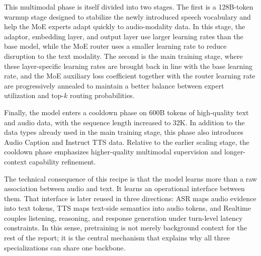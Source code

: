 \documentclass{llmxive}
\begin{document}
This multimodal phase is itself divided into two stages. The first is a 128B-token warmup stage designed to stabilize the newly introduced speech vocabulary and help the MoE experts adapt quickly to audio-modality data. In this stage, the adaptor, embedding layer, and output layer use larger learning rates than the base model, while the MoE router uses a smaller learning rate to reduce disruption to the text modality. The second is the main training stage, where these layer-specific learning rates are brought back in line with the base learning rate, and the MoE auxiliary loss coefficient together with the router learning rate are progressively annealed to maintain a better balance between expert utilization and top-$k$ routing probabilities.

Finally, the model enters a cooldown phase on 600B tokens of high-quality text and audio data, with the sequence length increased to 32K. In addition to the data types already used in the main training stage, this phase also introduces Audio Caption and Instruct TTS data. Relative to the earlier scaling stage, the cooldown phase emphasizes higher-quality multimodal supervision and longer-context capability refinement.

The technical consequence of this recipe is that the model learns more than a raw association between audio and text. It learns an operational interface between them. That interface is later reused in three directions: ASR maps audio evidence into text tokens, TTS maps text-side semantics into audio tokens, and Realtime couples listening, reasoning, and response generation under turn-level latency constraints. In this sense, pretraining is not merely background context for the rest of the report; it is the central mechanism that explains why all three specializations can share one backbone.


\end{document}
